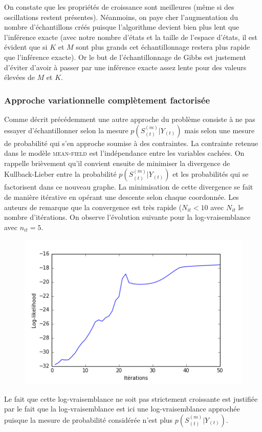 \documentclass[10pt,a4paper]{article}
\newcommand{\meanfield}{\textsc{mean-field}}
\begin{document}
On constate que les propriétés de croissance sont meilleures (même si des 
oscillations restent présentes). Néanmoins, on paye cher l'augmentation du 
nombre d'échantillons créés puisque l'algorithme devient bien plus lent que 
l'inférence exacte (avec notre nombre d'états et la taille de l'espace d'états, 
il est évident que si $K$ et $M$ sont plus grands cet échantillonnage restera 
plus rapide que l'inférence exacte). Or le but de l'échantillonnage de Gibbs 
est justement d'éviter d'avoir à passer par une inférence exacte assez lente 
pour des valeurs élevées de $M$ et $K$.
\subsubsection{Approche variationnelle complètement factorisée}
Comme décrit précédemment une autre approche du problème consiste à ne pas 
essayer d'échantillonner selon la mesure $p(S_{(t)}^{(m)} \vert Y_{(t)})$ mais 
selon une mesure de probabilité qui s'en approche soumise à des contraintes. La 
contrainte retenue dans le modèle \meanfield{} est l'indépendance entre les 
variables cachées. On rappelle brièvement qu'il convient ensuite de minimiser 
la divergence de Kullback-Lieber entre la probabilité $p(S_{(t)}^{(m)} \vert 
Y_{(t)})$ et les probabilités qui se factorisent dans ce nouveau graphe. La 
minimisation de cette divergence se fait de manière itérative en opérant une 
descente selon chaque coordonnée. Les auteurs de \cite{ghahramani1997factorial} 
remarque que la convergence est très rapide ($N_{it}< 10$ avec $N_{it}$ le 
nombre d'itérations. On observe l'évolution suivante pour la log-vraisemblance 
avec $n_{it} = 5$.

\begin{figure}[H]
\centering
\includegraphics[scale=0.5]{../resources/pictures/M3_K2_meanfield.png}
\end{figure}

Le fait que cette log-vraisemblance ne soit pas strictement croissante est 
justifiée par le fait que la log-vraisemblance est ici une log-vraisemblance 
approchée puisque la mesure de probabilité considérée n'est plus 
$p(S_{(t)}^{(m)} \vert Y_{(t)})$.

\label{results}
  
  
\end{document}
